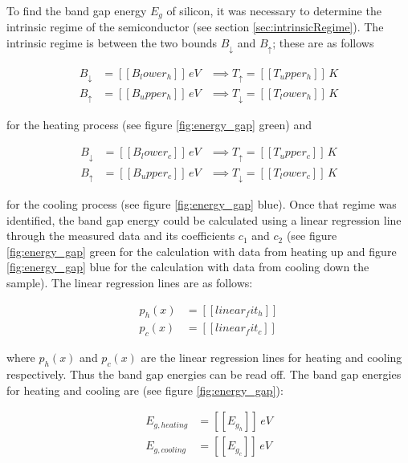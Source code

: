 \documentclass[a4paper]{article}
\begin{document}
To find the band gap energy $E_g$ of silicon, it was necessary to determine the intrinsic regime of the semiconductor (see section \ref{sec:intrinsicRegime}). The intrinsic regime is between the two bounds $B_{\downarrow}$ and $B_{\uparrow}$; these are as follows

\begin{subequations}
\begin{align}
B_{\downarrow} &= [[B_lower_h]] \, eV &\implies T_{\uparrow} = [[T_upper_h]] \, K\\
B_{\uparrow} &= [[B_upper_h]] \, eV &\implies T_{\downarrow} = [[T_lower_h]] \, K
\end{align}
\end{subequations}

for the heating process (see figure \ref{fig:energy_gap} green) and 

\begin{subequations}
\begin{align}
B_{\downarrow} &= [[B_lower_c]] \, eV &\implies T_{\uparrow} = [[T_upper_c]] \, K \\
B_{\uparrow} &= [[B_upper_c]] \, eV &\implies T_{\downarrow} = [[T_lower_c]] \, K
\end{align}
\end{subequations}

for the cooling process (see figure \ref{fig:energy_gap} blue). Once that regime was identified, the band gap energy could be calculated using a linear regression line through the measured data and its coefficients $c_1$ and $c_2$ (see figure \ref{fig:energy_gap} green for the calculation with data from heating up and figure \ref{fig:energy_gap} blue for the calculation with data from cooling down the sample). The linear regression lines are as follows:

\begin{subequations}
\begin{align}
p_{h}(x) &= [[linear_fit_h]] \\
p_{c}(x) &= [[linear_fit_c]]
\end{align}
\end{subequations}

where $p_h(x)$ and $p_c(x)$ are the linear regression lines for heating and cooling respectively. Thus the band gap energies can be read off. The band gap energies for heating and cooling are (see figure \ref{fig:energy_gap}):

\begin{subequations}
\begin{align}
E_{g,heating} &= [[E_g_h]] \, eV \label{eq:egh} \\
E_{g,cooling} &= [[E_g_c]] \, eV \label{eq:egc}
\end{align}
\end{subequations}
\end{document}
